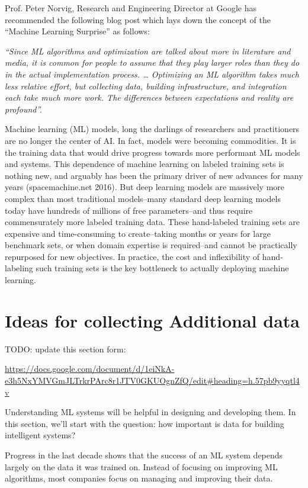 \documentclass[openany]{book}
\begin{document}
Prof. Peter Norvig, Research and Engineering Director at Google has recommended the following blog post which lays down the concept of the “Machine Learning Surprise” as follows: 

\textit{“Since ML algorithms and optimization are talked about more in literature and media, it is common for people to assume that they play larger roles than they do in the actual implementation process. … Optimizing an ML algorithm takes much less relative effort, but collecting data, building infrastructure, and integration each take much more work. The differences between expectations and reality are profound”. }

Machine learning (ML) models, long the darlings of researchers and practitioners are no longer the center of AI. In fact, models were becoming commodities. It is the training data that would drive progress towards more performant ML models and systems. This dependence of machine learning on labeled training sets is nothing new, and arguably has been the primary driver of new advances for many years (spacemachine.net 2016). But deep learning models are massively more complex than most traditional models–many standard deep learning models today have hundreds of millions of free parameters–and thus require commensurately more labeled training data. These hand-labeled training sets are expensive and time-consuming to create–taking months or years for large benchmark sets, or when domain expertise is required–and cannot be practically repurposed for new objectives. In practice, the cost and inflexibility of hand-labeling such training sets is the key bottleneck to actually deploying machine learning.

\section{Ideas for collecting Additional data}


TODO: update this section form: 

\url{https://docs.google.com/document/d/1eiNkA-e3h5NxYMVGmJLTrkrPArc8r1JTV0GKUOgnZfQ/edit#heading=h.57pb9yyqtl4v}


Understanding ML systems will be helpful in designing and developing them. In this section, we’ll start with the question: how important is data for building intelligent systems?

Progress in the last decade shows that the success of an ML system depends largely on the data it was trained on. Instead of focusing on improving ML algorithms, most companies focus on managing and improving their data.
\end{document}
